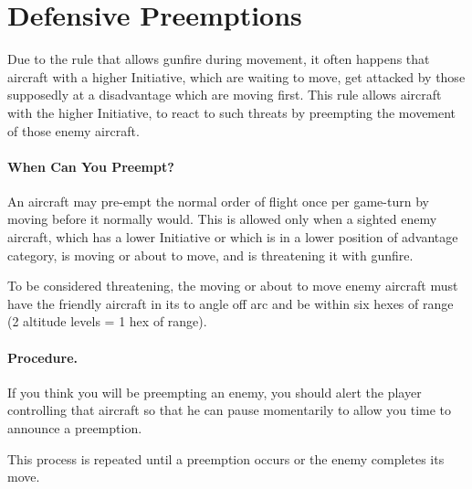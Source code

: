\section{Defensive Preemptions}
\label{rule:defensive-preemptions}

Due to the rule that allows gunfire during movement, it often happens that aircraft with a higher Initiative, which are waiting to move, get attacked by those supposedly at a disadvantage which are moving first. This rule allows aircraft with the higher Initiative, to react to such threats by preempting the movement of those enemy aircraft.

\paragraph{When Can You Preempt?} An aircraft may pre-empt the normal order of flight once per game-turn by moving before it normally would. This is allowed only when a sighted enemy aircraft, which has a lower Initiative or which is in a lower position of advantage category, is moving or about to move, and is threatening it with gunfire.

To be considered threatening, the moving or about to move enemy aircraft must have the friendly aircraft in its  to  angle off arc and be within six hexes of range (2 altitude levels = 1 hex of range).

\paragraph{Procedure.} If you think you will be preempting an enemy, you should alert the player controlling that aircraft so that he can pause momentarily  to allow you time to announce a preemption. 

  This process is repeated until a preemption occurs or the enemy completes its move.


